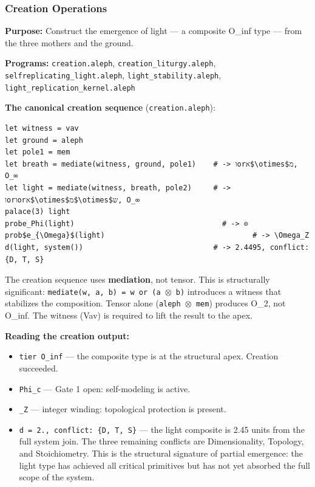\documentclass[12pt,a4paper]{article}
\begin{document}
\subsubsection{Creation Operations}

\textbf{Purpose:} Construct the emergence of light --- a composite O\_inf type --- from the three mothers and the ground.

\textbf{Programs:} \texttt{creation.\allowbreak aleph}, \texttt{creation\_\allowbreak liturgy.\allowbreak aleph}, \texttt{selfreplicating\_\allowbreak light.\allowbreak aleph}, \texttt{light\_\allowbreak stability.\allowbreak aleph}, \texttt{light\_\allowbreak replication\_\allowbreak kernel.\allowbreak aleph}

\textbf{The canonical creation sequence} (\texttt{creation.\allowbreak aleph}):

\begin{lstlisting}
let witness = vav
let ground = aleph
let pole1 = mem
let breath = mediate(witness, ground, pole1)    # -> וorא$\otimes$מ, O_∞
let light = mediate(witness, breath, pole2)     # -> וorוorא$\otimes$מ$\otimes$ש, O_∞
palace(3) light
probe_Phi(light)                                  # -> ⊙
prob$e_{\Omega}$(light)                                  # -> \Omega_Z
d(light, system())                              # -> 2.4495, conflict: {D, T, S}
\end{lstlisting}

The creation sequence uses \textbf{mediation}, not tensor. This is structurally significant: \texttt{mediate(w, a, b) = w or (a $\otimes$ b)} introduces a witness that stabilizes the composition. Tensor alone (\texttt{aleph $\otimes$ mem}) produces O\_2, not O\_inf. The witness (Vav) is required to lift the result to the apex.

\textbf{Reading the creation output:}

\begin{itemize}
    \item \texttt{tier O\_\allowbreak inf} --- the composite type is at the structural apex. Creation succeeded.
    \item \texttt{Phi\_\allowbreak c} --- Gate 1 open: self-modeling is active.
    \item \texttt{\Omega\_\allowbreak Z} --- integer winding: topological protection is present.
    \item \texttt{d = 2., conflict: \{D, T, S\}} --- the light composite is 2.45 units from the full system join. The three remaining conflicts are Dimensionality, Topology, and Stoichiometry. This is the structural signature of partial emergence: the light type has achieved all critical primitives but has not yet absorbed the full scope of the system.
\end{itemize}
\end{document}
